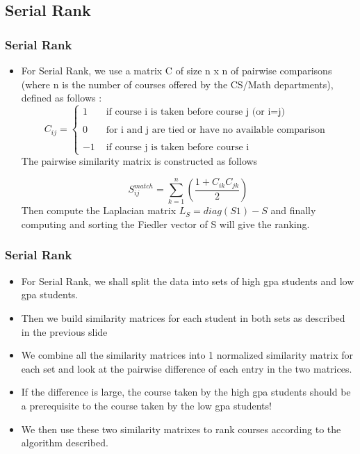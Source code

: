 \documentclass{beamer}
\begin{document}
\subsection{Serial Rank}
\begin{frame}
     \frametitle{Serial Rank}
\begin{itemize}
\item For Serial Rank, we use a matrix C of size n x n of pairwise comparisons (where n is the number of courses offered by the CS/Math departments), defined as follows :
\begin{equation}
C_{ij} = \left\{
	\begin{array}{rl}
 1 & \text{ if course i is taken before course j (or i=j)} 	\\
 &  \\
 0 & \text{ for i and j are tied or have no available comparison }	\\
 &  \\
 -1 & \text{ if course j is taken before course i} 
     \end{array}
   \right.
\label{myExpValue}
\end{equation}
The pairwise similarity matrix is constructed as follows

$$S_{ij}^{match} = \sum_{k=1}^{n}(\frac{1+C_{ik}C_{jk}}{2})$$
Then compute the Laplacian matrix $L_{S} = diag(S1) - S$ and finally computing and sorting the Fiedler vector of S will give the ranking. 

\end{itemize}
\end{frame} 

\begin{frame}
     \frametitle{Serial Rank}
\begin{itemize}
\item For Serial Rank, we shall split the data into sets of high gpa students and low gpa students.
\item Then we build similarity matrices for each student in both sets as described in the previous slide
\item We combine all the similarity matrices into 1 normalized similarity matrix for each set and look at the pairwise difference of each entry in the two matrices.
\item If the difference is large, the course taken by the high gpa students should be a prerequisite to the course taken by the low gpa students!
\item We then use these two similarity matrixes to rank courses according to the algorithm described.
\end{itemize}
\end{frame}
\end{document}
